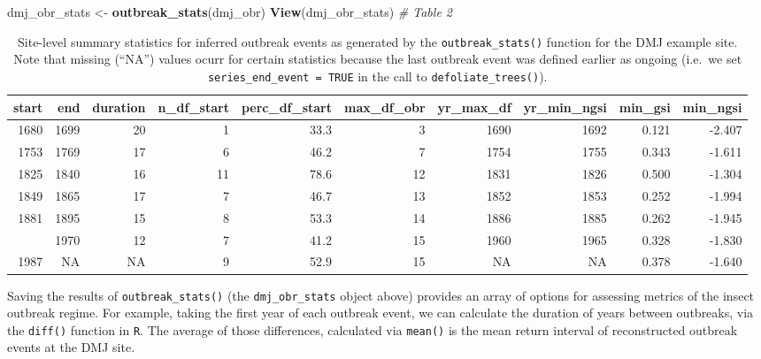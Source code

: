 \documentclass[review]{elsarticle} %
\newenvironment{Shaded}{\begin{snugshade}}{\end{snugshade}}
\newcommand{\CommentTok}[1]{\textcolor[rgb]{0.56,0.35,0.01}{\textit{#1}}}
\newcommand{\KeywordTok}[1]{\textcolor[rgb]{0.13,0.29,0.53}{\textbf{#1}}}
\newcommand{\NormalTok}[1]{#1}
\newcommand{\StringTok}[1]{\textcolor[rgb]{0.31,0.60,0.02}{#1}}
\begin{document}
\begin{Shaded}
\begin{Highlighting}[]
\NormalTok{dmj_obr_stats <-}\StringTok{ }\KeywordTok{outbreak_stats}\NormalTok{(dmj_obr)}
\KeywordTok{View}\NormalTok{(dmj_obr_stats) }\CommentTok{# Table 2}
\end{Highlighting}
\end{Shaded}



\begin{landscape}\begin{table}

\caption{\label{tab:tbl-obr}Site-level summary statistics for inferred outbreak events as generated by the \texttt{outbreak\_stats()} function for the DMJ example site. Note that missing (``NA'') values ocurr for certain statistics because the last outbreak event was defined earlier as ongoing (i.e.~we set \texttt{series\_end\_event\ =\ TRUE} in the call to \texttt{defoliate\_trees()}).}
\centering
\fontsize{7}{9}\selectfont
\begin{tabular}[t]{rrrrrrrrrr}
\toprule
start & end & duration & n\_df\_start & perc\_df\_start & max\_df\_obr & yr\_max\_df & yr\_min\_ngsi & min\_gsi & min\_ngsi\\
\midrule
1680 & 1699 & 20 & 1 & 33.3 & 3 & 1690 & 1692 & 0.121 & -2.407\\
1753 & 1769 & 17 & 6 & 46.2 & 7 & 1754 & 1755 & 0.343 & -1.611\\
1825 & 1840 & 16 & 11 & 78.6 & 12 & 1831 & 1826 & 0.500 & -1.304\\
1849 & 1865 & 17 & 7 & 46.7 & 13 & 1852 & 1853 & 0.252 & -1.994\\
1881 & 1895 & 15 & 8 & 53.3 & 14 & 1886 & 1885 & 0.262 & -1.945\\
\addlinespace
1959 & 1970 & 12 & 7 & 41.2 & 15 & 1960 & 1965 & 0.328 & -1.830\\
1987 & NA & NA & 9 & 52.9 & 15 & NA & NA & 0.378 & -1.640\\
\bottomrule
\end{tabular}
\end{table}
\end{landscape}

Saving the results of \texttt{outbreak\_stats()} (the \texttt{dmj\_obr\_stats} object above) provides an array of options for assessing metrics of the insect outbreak regime. For example, taking the first year of each outbreak event, we can calculate the duration of years between outbreaks, via the \texttt{diff()} function in \texttt{R}. The average of those differences, calculated via \texttt{mean()} is the mean return interval of reconstructed outbreak events at the DMJ site.
\end{document}
